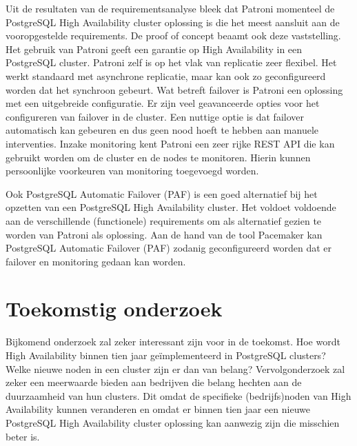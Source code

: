 \documentclass[a0,portrait]{a0poster}
\begin{document}
\begin{multicols}{2}
Uit de resultaten van de requirementsanalyse bleek dat Patroni momenteel de PostgreSQL High Availability cluster oplossing is die het meest aansluit aan de vooropgestelde requirements. De proof of concept beaamt ook deze vaststelling. Het gebruik van Patroni geeft een garantie op High Availability in een PostgreSQL cluster. Patroni zelf is op het vlak van replicatie zeer flexibel. Het werkt standaard met asynchrone replicatie, maar kan ook zo geconfigureerd worden dat het synchroon gebeurt. Wat betreft failover is Patroni een oplossing met een uitgebreide configuratie. Er zijn veel geavanceerde opties voor het configureren van failover in de cluster. Een nuttige optie is dat failover automatisch kan gebeuren en dus geen nood hoeft te hebben aan manuele interventies. Inzake monitoring kent Patroni een zeer rijke REST API die kan gebruikt worden om de cluster en de nodes te monitoren. Hierin kunnen persoonlijke voorkeuren van monitoring toegevoegd worden.

Ook PostgreSQL Automatic Failover (PAF) is een goed alternatief bij het opzetten van een PostgreSQL High Availability cluster. Het voldoet voldoende aan de verschillende (functionele) requirements om als alternatief gezien te worden van Patroni als oplossing. Aan de hand van de tool Pacemaker kan PostgreSQL Automatic Failover (PAF) zodanig geconfigureerd worden dat er failover en monitoring gedaan kan worden.


\color{HoGentAccent1} 
\section*{Toekomstig onderzoek}
\color{black}
Bijkomend onderzoek zal zeker interessant zijn voor in de toekomst. Hoe wordt High Availability binnen tien jaar geïmplementeerd in PostgreSQL clusters? Welke nieuwe noden in een cluster zijn er dan van belang? Vervolgonderzoek zal zeker een meerwaarde bieden aan bedrijven die belang hechten aan de duurzaamheid van hun clusters.
Dit omdat de specifieke (bedrijfs)noden van High Availability kunnen veranderen en omdat er binnen tien jaar een nieuwe PostgreSQL High Availability cluster oplossing kan aanwezig zijn die misschien beter is.



\end{multicols}
\end{document}
